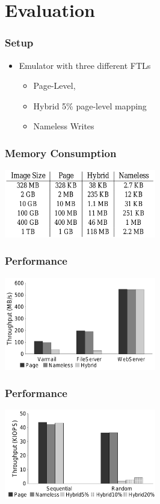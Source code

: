 \documentclass{beamer}
\begin{document}
\section{Evaluation}
\begin{frame}
  \frametitle{Setup}
  \begin{itemize}
    \item Emulator with three different FTLs
    \begin{itemize}
    	\item Page-Level,
    	\item Hybrid 5\% page-level mapping
    	\item Nameless Writes
    \end{itemize}
  \end{itemize}
\end{frame}

\begin{frame}
  \frametitle{Memory Consumption}
  \begin{center}
  \includegraphics[width=250px]{consumption.png}
  \end{center}
\end{frame}

\begin{frame}
  \frametitle{Performance}
  \begin{center}
  \includegraphics[width=250px]{throughput.png}
  \end{center}
\end{frame}

\begin{frame}
  \frametitle{Performance}
  \begin{center}
  \includegraphics[width=250px]{throughput_2.png}
  \end{center}
\end{frame}
\end{document}
